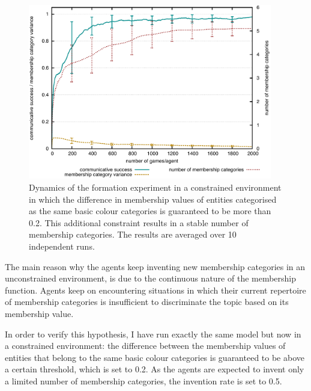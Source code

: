 \begin{figure}[htpb]
  \begin{center}
    \includegraphics[width=0.95\textwidth]{./graded-membership/figures/strict-formation-constrained.pdf} %
    \caption[Dynamics of the formation experiment in a constrained
    environment]{Dynamics of the formation experiment in a
      constrained environment in which the difference in membership
      values of entities categorised as the same basic colour
      categories is guaranteed to be more than 0.2. This additional
      constraint results in a stable number of membership
      categories. The results are averaged over 10 independent runs.}
    \label{f:gm-formation-constrained-dynamics}
  \end{center}
\end{figure}

The main reason why the agents keep inventing new membership
categories in an unconstrained environment, is due to the continuous
nature of the membership function. Agents keep on encountering
situations in which their current repertoire of membership categories
is insufficient to discriminate the topic based on its membership
value. 

In order to verify this hypothesis, I have run exactly the same
model but now in a constrained environment: the difference between the
membership values of entities that belong to the same basic colour
categories is guaranteed to be above a certain threshold, which is set
to 0.2. As the agents are expected to invent only a limited number of
membership categories, the invention rate is set to 0.5.

